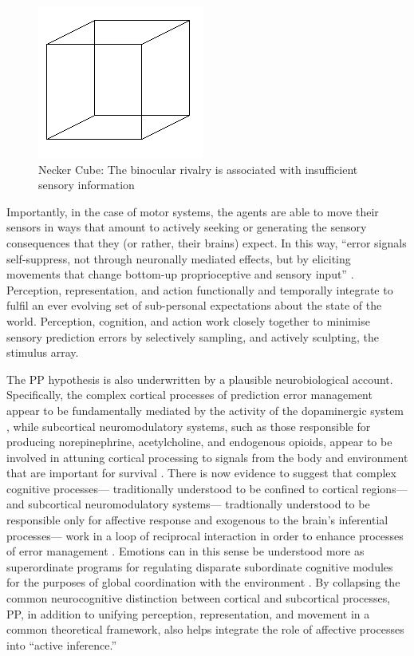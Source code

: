 \begin{CJK}{UTF8}{gbsn}
{\begin{figure}[htbp]
  \begin{center}
    \includegraphics{images/Necker_cube.png}
      \caption{Necker Cube: The binocular rivalry is associated with insufficient sensory information}
        \label{fig:neckerCube}
   \end{center}
\end{figure}

Importantly, in the case of motor systems, the agents are able to move their sensors in ways that amount to actively seeking or generating the sensory consequences that they (or rather, their brains) expect.  In this way, ``error signals self-suppress, not through neuronally mediated effects, but by eliciting movements that change bottom-up proprioceptive and sensory input'' \citep[186]{Clark2013}. Perception, representation, and action functionally and temporally integrate to fulfil an ever evolving set of sub-personal expectations about the state of the world.  Perception, cognition, and action work closely together to minimise sensory prediction errors by selectively sampling, and actively sculpting, the stimulus array.

The PP hypothesis is also underwritten by a plausible neurobiological account. Specifically, the complex cortical processes of prediction error management appear to be fundamentally mediated by the activity of the dopaminergic system \citep{Schultz2016}, while subcortical neuromodulatory systems, such as those responsible for producing norepinephrine, acetylcholine, and endogenous opioids, appear to be involved in attuning cortical processing to signals from the body and environment that are important for survival \citep{Lewis2005}.  There is now evidence to suggest that complex cognitive processes--- traditionally understood to be confined to cortical regions--- and subcortical neuromodulatory systems--- tradtionally understood to be responsible only for affective response and exogenous to the brain's inferential processes--- work in a loop of reciprocal interaction in order to enhance processes of error management \citep{Damasio1994,Lewis2005,Miller2017,Barrett2017}.
Emotions can in this sense be understood more as superordinate programs for regulating disparate subordinate cognitive modules for the purposes of global coordination with the environment \citep{Cosmides2000}.  By collapsing the common neurocognitive distinction between cortical and subcortical processes, PP, in addition to unifying perception, representation, and movement in a common theoretical framework, also helps integrate the role of affective processes into ``active inference.''

}
\end{CJK}
